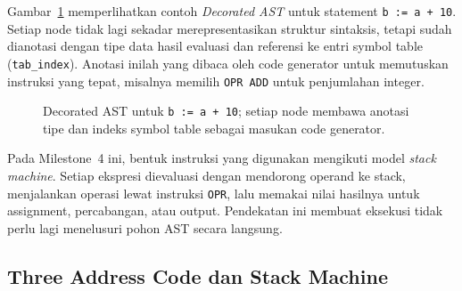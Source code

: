 \documentclass[11pt,a4paper]{article}
\begin{document}
Gambar~\ref{fig:dast} memperlihatkan contoh \textit{Decorated AST} untuk
statement \texttt{b := a + 10}. Setiap node tidak lagi sekadar merepresentasikan
struktur sintaksis, tetapi sudah dianotasi dengan tipe data hasil evaluasi dan
referensi ke entri symbol table (\texttt{tab\_index}). Anotasi inilah yang dibaca
oleh code generator untuk memutuskan instruksi yang tepat, misalnya memilih
\texttt{OPR ADD} untuk penjumlahan integer.

\begin{figure}[H]
\centering
{}
\caption{Decorated AST untuk \texttt{b := a + 10}; setiap node membawa anotasi
tipe dan indeks symbol table sebagai masukan code generator.}
\label{fig:dast}
\end{figure}

Pada Milestone~4 ini, bentuk instruksi yang digunakan mengikuti model
\textit{stack machine}. Setiap ekspresi dievaluasi dengan mendorong operand ke
stack, menjalankan operasi lewat instruksi \texttt{OPR}, lalu memakai nilai
hasilnya untuk assignment, percabangan, atau output. Pendekatan ini membuat
eksekusi tidak perlu lagi menelusuri pohon AST secara langsung.

\subsection{Three Address Code dan Stack Machine}
\end{document}
